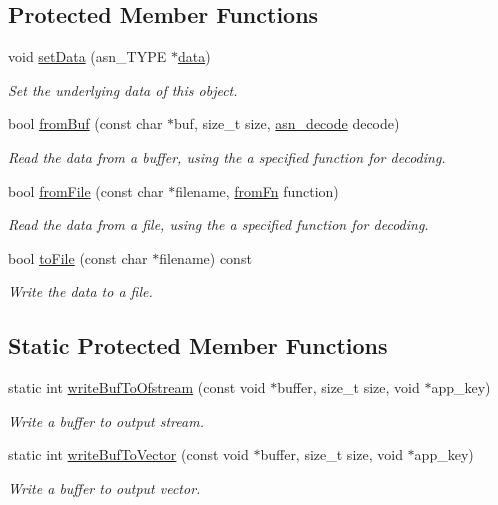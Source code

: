 \subsection*{Protected Member Functions}
\begin{DoxyCompactItemize}
\item 
void \hyperlink{classASN1CContainer_aca77386df5f80660d8a72481d96eabe0}{set\+Data} (asn\+\_\+\+T\+Y\+PE $\ast$\hyperlink{classASN1CContainer_a025329e80ae2a3216fc1d1cf6a8f957d}{data})
\begin{DoxyCompactList}\small\item\em Set the underlying data of this object. \end{DoxyCompactList}\item 
bool \hyperlink{classASN1CContainer_a24949d778b5d738c17f80127ab4b188f}{from\+Buf} (const char $\ast$buf, size\+\_\+t size, \hyperlink{classASN1CContainer_a9edaf11eed4f5ded9a32200e43832e72}{asn\+\_\+decode} decode)
\begin{DoxyCompactList}\small\item\em Read the data from a buffer, using the a specified function for decoding. \end{DoxyCompactList}\item 
bool \hyperlink{classASN1CContainer_a90a2a5fbe0601dff3b2ac886f06afd6b}{from\+File} (const char $\ast$filename, \hyperlink{classASN1CContainer_a5830db096eef3cee08cb7e948624aa3c}{from\+Fn} function)
\begin{DoxyCompactList}\small\item\em Read the data from a file, using the a specified function for decoding. \end{DoxyCompactList}\item 
bool \hyperlink{classASN1CContainer_a6fec3867e5aa5893dc497add7f179111}{to\+File} (const char $\ast$filename) const 
\begin{DoxyCompactList}\small\item\em Write the data to a file. \end{DoxyCompactList}\end{DoxyCompactItemize}
\subsection*{Static Protected Member Functions}
\begin{DoxyCompactItemize}
\item 
static int \hyperlink{classASN1CContainer_aa0216c3146bad94b0429fd56da4565f0}{write\+Buf\+To\+Ofstream} (const void $\ast$buffer, size\+\_\+t size, void $\ast$app\+\_\+key)
\begin{DoxyCompactList}\small\item\em Write a buffer to output stream. \end{DoxyCompactList}\item 
static int \hyperlink{classASN1CContainer_a89eaae98d4b34890bc8745bf0f834c8d}{write\+Buf\+To\+Vector} (const void $\ast$buffer, size\+\_\+t size, void $\ast$app\+\_\+key)
\begin{DoxyCompactList}\small\item\em Write a buffer to output vector. \end{DoxyCompactList}\end{DoxyCompactItemize}


